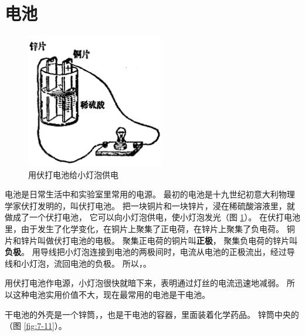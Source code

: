 \section{电池}\label{sec:7-5}

\begin{figure}
    \centering
    \includegraphics[width=6cm]{../pic/czwl2-ch7-10}
    \caption{用伏打电池给小灯泡供电}\label{fig:7-10}
\end{figure}

电池是日常生活中和实验室里常用的电源。
最初的电池是十九世纪初意大利物理学家伏打发明的，叫伏打电池。
把一块铜片和一块锌片，浸在稀硫酸溶液里，就做成了一个伏打电池，
它可以向小灯泡供电，使小灯泡发光（图 \ref{fig:7-10}）。
在伏打电池里，由于发生了化学变化，在铜片上聚集了正电荷，在锌片上聚集了负电荷。
铜片和锌片叫做伏打电池的电极。
聚集正电荷的铜片叫\textbf{正极}，
聚集负电荷的锌片叫\textbf{负极}。
用导线把小灯泡连接到电池的两极间时，电流从电池的正极流出，经过导线和小灯泡，流回电池的负极。
所以，。

用伏打电池作电源，小灯泡很快就暗下来，表明通过灯丝的电流迅速地减弱。
所以这种电池实用价值不大，现在最常用的电池是干电池。

干电池的外壳是一个锌筒，，也是干电池的容器，里面装着化学药品。
锌筒中央的（图 \ref{fig:7-11}）。

